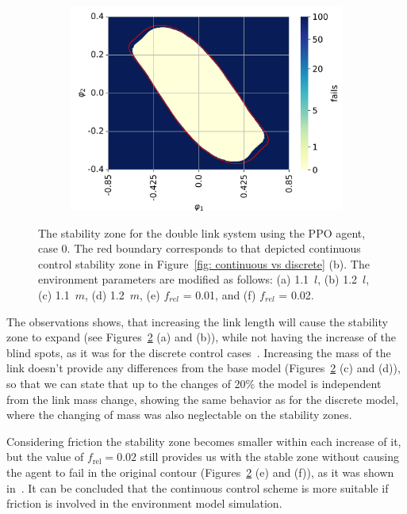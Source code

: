 \begin{figure}[h!]
\begin{subfigure}[t]{0.32\textwidth}
         \includegraphics[width=\textwidth]{Figures/DP_friction_0.02.png}
         \label{fig: DP friction 0.02}
         \caption{}
     \end{subfigure}

     \caption{The stability zone for the double link system using the PPO agent, case 0. The red boundary corresponds to that depicted continuous control stability zone in Figure~\ref{fig: continuous vs discrete} (b). The environment parameters are modified as follows: (a) 1.1~$l$, (b) 1.2~$l$, (c) 1.1~$m$, (d) 1.2~$m$, (e) $f_{rel}$ = 0.01, and (f) $f_{rel}$ = 0.02.}
     \label{fig: agent impact on different environments}
 \end{figure}

The observations shows, that increasing the link length will cause the stability zone to expand (see Figures~\ref{fig: agent impact on different environments} (a) and (b)), while not having the increase of the blind spots, as it was for the discrete control cases~\cite{manzl2023relrl}. Increasing the mass of the link doesn't provide any differences from the base model (Figures~\ref{fig: agent impact on different environments} (c) and (d)), so that we can state that up to the changes of 20\% the model is independent from the link mass change, showing the same behavior as for the discrete model, where the changing of mass was also neglectable on the stability zones.

Considering friction the stability zone becomes smaller within each increase of it, but the value of \( f_{\text{rel}} = 0.02 \) still provides us with the stable zone without causing the agent to fail in the original contour (Figures~\ref{fig: agent impact on different environments} (e) and (f)), as it was shown in~\cite{manzl2023relrl}. It can be concluded that the continuous control scheme is more suitable if friction is involved in the environment model simulation.
